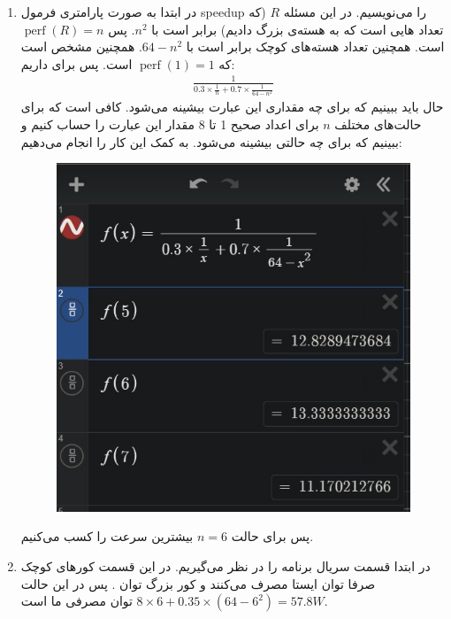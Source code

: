 \begin{enumerate}
   \item در ابتدا به صورت پارامتری فرمول speedup را می‌نویسیم.
   در این مسئله
   $R$
   (که تعداد هایی است که به هسته‌ی بزرگ دادیم)
   برابر است با
   $n^2$.
   پس
   $\operatorname{perf}(R) = n$
   است. همچنین تعداد هسته‌های کوچک برابر است با
   $64 - n^2$.
   همچنین مشخص است که
   $\operatorname{perf}(1) = 1$
   است.
   پس برای
   داریم:
   \begin{gather*}
        \frac{1}{0.3 \times \frac{1}{n} + 0.7 \times \frac{1}{64 - n^2}}
   \end{gather*}
   حال باید ببینیم که برای چه مقداری این عبارت بیشینه می‌شود.
   کافی است که برای حالت‌های مختلف
   $n$
   برای اعداد صحیح 1 تا 8 مقدار این عبارت را حساب کنیم و ببینیم که برای چه حالتی بیشینه می‌شود. به کمک
   این کار را انجام می‌دهیم:
    \begin{figure}[H]
        \centerline{\includegraphics[scale=0.5]{pics/1-1.jpg}}
    \end{figure}
    پس برای حالت
    $n = 6$
    بیشترین سرعت را کسب می‌کنیم.
    \item در ابتدا قسمت سریال برنامه را در نظر می‌‌گیریم. در این قسمت کور‌های کوچک صرفا توان ایستا مصرف می‌کنند
    و کور بزرگ توان . پس در این حالت $8 \times 6 + 0.35 \times (64 - 6^2) = 57.8W$ توان مصرفی ما است.

\end{enumerate}
